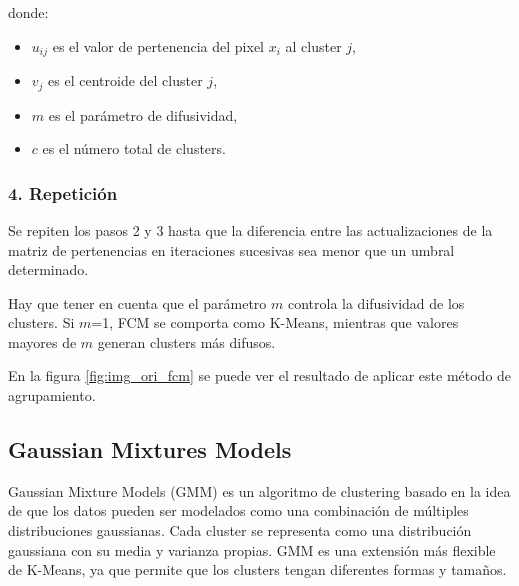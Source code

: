 donde:

\begin{itemize}
\setlength{\itemsep}{-1ex}
   \item{\begin{flushleft} $u_{ij}$ es el valor de pertenencia del pixel $x_i$ al cluster $j$, \end{flushleft}}
   \item{\begin{flushleft} $v_j$ es el centroide del cluster $j$, \end{flushleft}}
   \item{\begin{flushleft} $m$ es el parámetro de difusividad, \end{flushleft}}
   \item{\begin{flushleft} $c$ es el número total de clusters. \end{flushleft}}
\end{itemize}

\subsubsection{4. Repetición}

Se repiten los pasos 2 y 3 hasta que la diferencia entre las actualizaciones de la matriz de pertenencias en iteraciones sucesivas sea menor que un umbral determinado.

Hay que tener en cuenta que el parámetro $m$ controla la difusividad de los clusters. Si $m$=1, FCM se comporta como K-Means, mientras que valores mayores de $m$ generan clusters más difusos.

En la figura \ref{fig:img_ori_fcm} se puede ver el resultado de aplicar este método de agrupamiento.

\subsection{Gaussian Mixtures Models}\label{gaussian-mixtures-models}
Gaussian Mixture Models (GMM) \cite{MATLAB:2023bGMM} es un algoritmo de clustering basado en la idea de que los datos pueden ser modelados como una combinación de múltiples distribuciones gaussianas. Cada cluster se representa como una distribución gaussiana con su media y varianza propias. GMM es una extensión más flexible de K-Means, ya que permite que los clusters tengan diferentes formas y tamaños.

